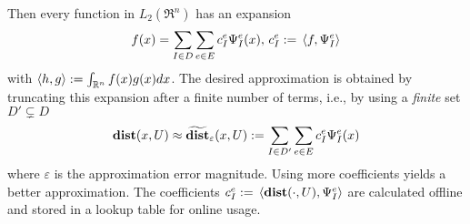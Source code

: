 Then every function in $L_2(\Re^n)$ has an expansion 
\[f(x) = \sum_{I \in D} \sum_{e \in E} c_I^e \Psi^e_I(x), \, c_I^e :=\, \langle f,\Psi^e_I \rangle\]
with $\langle h,g \rangle := \int_{\mathbb{R}^n}f(x)g(x)dx$.
The desired approximation is obtained by truncating this expansion after a finite number of terms, i.e., by using  a \textit{finite} set $D' \subsetneq D$
\begin{equation}
\mathbf{dist}(x,U) \approx \widetilde{\mathbf{dist}}_\varepsilon(x,U) := \sum_{I \in D'} \sum_{e \in E} c_I^e \Psi^e_I(x)
\end{equation}
where $\varepsilon$ is the approximation error magnitude.
Using more coefficients yields a better approximation.
The coefficients $c_I^e :=\, \langle \mathbf{dist}(\cdot, U), \Psi^e_I \rangle$ are calculated offline and stored in a lookup table for online usage.





